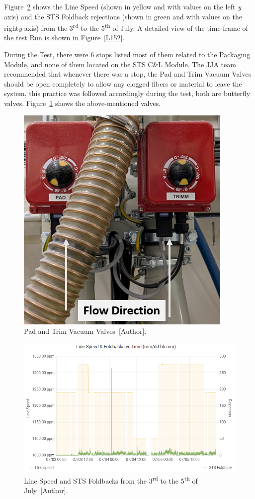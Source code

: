 Figure~\ref{L15} shows the Line Speed (shown in yellow and with values on the left \textit{y} axis) and the STS Foldback rejections (shown in green and with values on the right\textit{y} axis) from the 3\textsuperscript{rd} to the 5\textsuperscript{th} of July.  A detailed view of the time frame of the test Run is shown in Figure~\ref{L152}. 

During the Test,  there were 6 stops listed most of them related to the Packaging Module, and none of them located on the STS C\&L Module. The JJA team recommended that whenever there was a stop, the Pad and Trim Vacuum Valves should be open completely to allow any clogged fibers or material to leave the system, this practice was followed accordingly during the test, both are butterfly valves. Figure~\ref{valve} shows the above-mentioned valves. 

\begin{figure}[H]
    \centering
    \includegraphics[width=0.4\linewidth]{FIGURES/valves.png}
    \caption{Pad and Trim Vacuum Valves~[Author].}
    \label{valve}
\end{figure}

\begin{figure}[H]
    \centering
    \includegraphics[width=1\linewidth, height = 0.4\textheight]{FIGURES/L15_1.png}
    \caption{Line Speed and STS Foldbacks from the 3\textsuperscript{rd} to the 5\textsuperscript{th} of July~[Author].}
    \label{L15}
\end{figure}

